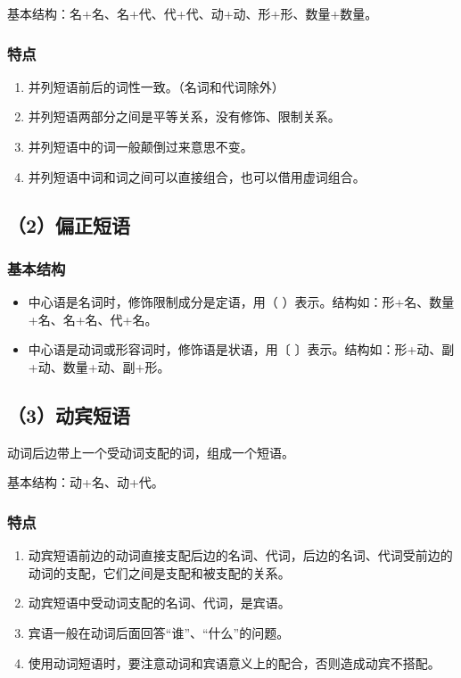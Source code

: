 基本结构：名+名、名+代、代+代、动+动、形+形、数量+数量。

\subsubsection*{特点}
\begin{enumerate}
    \item 并列短语前后的词性一致。（名词和代词除外）
    \item 并列短语两部分之间是平等关系，没有修饰、限制关系。
    \item 并列短语中的词一般颠倒过来意思不变。
    \item 并列短语中词和词之间可以直接组合，也可以借用虚词组合。
\end{enumerate}

\subsection{（2）偏正短语}
\subsubsection*{基本结构}
\begin{itemize}
    \item 中心语是名词时，修饰限制成分是定语，用（ ）表示。结构如：形+名、数量+名、名+名、代+名。
    \item 中心语是动词或形容词时，修饰语是状语，用〔 〕表示。结构如：形+动、副+动、数量+动、副+形。
\end{itemize}

\subsection{（3）动宾短语}
动词后边带上一个受动词支配的词，组成一个短语。

基本结构：动+名、动+代。

\subsubsection*{特点}
\begin{enumerate}
    \item 动宾短语前边的动词直接支配后边的名词、代词，后边的名词、代词受前边的动词的支配，它们之间是支配和被支配的关系。
    \item 动宾短语中受动词支配的名词、代词，是宾语。
    \item 宾语一般在动词后面回答“谁”、“什么”的问题。
    \item 使用动词短语时，要注意动词和宾语意义上的配合，否则造成动宾不搭配。
\end{enumerate}

